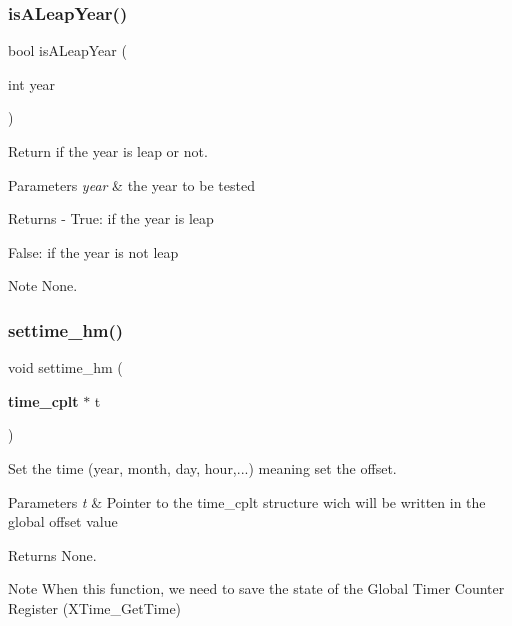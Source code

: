 \subsubsection{isALeapYear()}
{\footnotesize\ttfamily bool is\+A\+Leap\+Year (\begin{DoxyParamCaption}\item[{int}]{year }\end{DoxyParamCaption})}



Return if the year is leap or not. 


\begin{DoxyParams}{Parameters}
{\em year} & the year to be tested\\
\hline
\end{DoxyParams}
\begin{DoxyReturn}{Returns}
-\/ True\+: if the year is leap
\begin{DoxyItemize}
\item False\+: if the year is not leap
\end{DoxyItemize}
\end{DoxyReturn}
\begin{DoxyNote}{Note}
None. 
\end{DoxyNote}
\mbox{\label{time__hm_8h_a7cae5e3ee1050b12a5ec070daa05866c}} 
\subsubsection{settime\_hm()}
{\footnotesize\ttfamily void settime\+\_\+hm (\begin{DoxyParamCaption}\item[{\textbf{ time\+\_\+cplt} $\ast$}]{t }\end{DoxyParamCaption})}



Set the time (year, month, day, hour,...) meaning set the offset. 


\begin{DoxyParams}{Parameters}
{\em t} & Pointer to the time\+\_\+cplt structure wich will be written in the global offset value\\
\hline
\end{DoxyParams}
\begin{DoxyReturn}{Returns}
None.
\end{DoxyReturn}
\begin{DoxyNote}{Note}
When this function, we need to save the state of the Global Timer Counter Register (X\+Time\+\_\+\+Get\+Time) 
\end{DoxyNote}
\mbox{\label{time__hm_8h_aea8453e6247ec2872c89e25b17284666}} 
